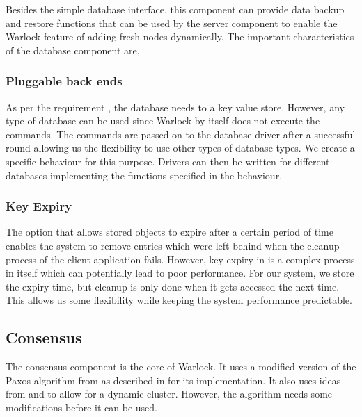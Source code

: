 Besides the simple database interface, this component can provide data
backup and restore functions that can be used by the server component to
enable the Warlock feature of adding fresh nodes dynamically. The important
characteristics of the database component are,

\subsubsection{Pluggable back ends}

As per the requirement , the database needs to a
key value store. However, any type of database can be used
since Warlock by itself does not execute the commands. The commands are passed
on to the database driver after a successful round allowing us the flexibility
to use other types of database types. We create a specific behaviour%
for this purpose. Drivers can then be written for different databases
implementing the functions specified in the behaviour.

\subsubsection{Key Expiry}
\label{section:a.n.d.expiry}

The option that allows stored objects to expire after a certain period of time
enables the system to remove entries which were left behind when the
cleanup process of the client application fails. However, key expiry in is a
complex process in itself which can potentially lead to
poor performance. For our system, we store the expiry time, but cleanup is
only done when it gets accessed the next time. This allows us some
flexibility while keeping the system performance predictable.

\subsection{Consensus}

The consensus component is the core of Warlock. It uses a modified version of
the Paxos algorithm from \citet{Robbert2011} as described in
 for its implementation. It also
uses ideas from \citet{LamportSP08} and \citet{LamportMZ10} to allow for
a dynamic cluster. However, the algorithm needs some modifications
 before it can be used.

